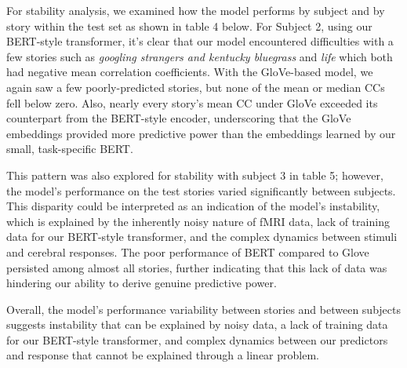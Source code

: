 \documentclass{article}
\begin{document}
For stability analysis, we examined how the model performs by subject and by story within the test set as shown in table 4 below. For Subject 2, using our BERT-style transformer, it's clear that our model encountered difficulties with a few stories such as \textit{googling strangers and kentucky bluegrass} and \textit{life} which both had negative mean correlation coefficients. With the GloVe-based model, we again saw a few poorly-predicted stories, but none of the mean or median CCs fell below zero. Also, nearly every story’s mean CC under GloVe exceeded its counterpart from the BERT-style encoder, underscoring that the GloVe embeddings provided more predictive power than the embeddings learned by our small, task-specific BERT.

This pattern was also explored for stability with subject 3 in table 5; however, the model's performance on the test stories varied significantly between subjects. This disparity could be interpreted as an indication of the model's instability, which is explained by the inherently noisy nature of fMRI data, lack of training data for our BERT-style transformer, and the complex dynamics between stimuli and cerebral responses. The poor performance of BERT compared to Glove persisted among almost all stories, further indicating that this lack of data was hindering our ability to derive genuine predictive power. 

Overall, the model's performance variability between stories and between subjects suggests instability that can be explained by noisy data, a lack of training data for our BERT-style transformer, and complex dynamics between our predictors and response that cannot be explained through a linear problem. 
\end{document}
